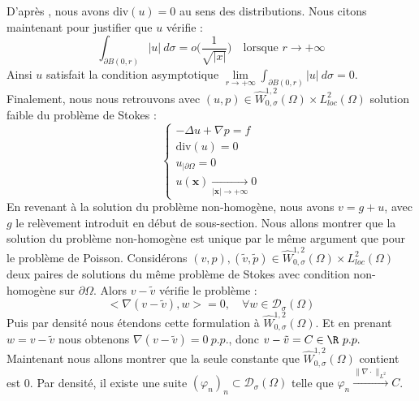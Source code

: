 D'après \cite{Sohr}, nous avons $\text{div}(u) = 0$ au sens des distributions.
Nous citons maintenant \cite{Galdi} pour justifier que $u$ vérifie : 
$$\int_{\partial B(0,r)} |u| \ d\sigma = o\bigg(\frac{1}{\sqrt{|x|}}\bigg) \quad \text{lorsque } r \to +\infty$$ 
Ainsi $u$ satisfait la condition asymptotique $\displaystyle \underset{r \to +\infty}{\lim} \int_{\partial B(0,r)} |u| \ d\sigma = 0$.
Finalement, nous nous retrouvons avec $(u,p) \in \widehat{W}_{0,\sigma}^{1,2}(\Omega)\times L^2_{loc}(\Omega)$ solution faible du problème de Stokes :
$$ \begin{cases}
    -\Delta u + \nabla p = f \\
    \text{div}(u) = 0 \\
    u_{|\partial \Omega} = 0 \\
    u(\mathbf{x}) \xrightarrow[|\mathbf{x}|\to +\infty]{} 0
\end{cases} $$
En revenant à la solution du problème non-homogène, nous avons $v = g + u$, avec $g$ le relèvement introduit en début de sous-section. 
Nous allons montrer que la solution du problème non-homogène est unique par le même argument que pour le problème de Poisson.
Considérons $(v,p),(\tilde{v},\tilde{p}) \in \widehat{W}_{0,\sigma}^{1,2}(\Omega) \times L^2_{loc}(\Omega)$ deux paires de solutions du même problème de Stokes avec condition non-homogène sur $\partial \Omega$. Alors $v - \tilde{v}$ vérifie le problème :
$$ \big< \nabla (v - \tilde{v}), w \big> = 0, \quad \forall w \in \mathcal{D}_{\sigma}(\Omega) $$
Puis par densité nous étendons cette formulation à $\widehat{W}_{0,\sigma}^{1,2}(\Omega)$. Et en prenant $w = v - \tilde{v}$ nous obtenons $\nabla(v - \tilde{v}) = 0 \ p.p.$, donc $v - \tilde{v} = C \in \R \ p.p.$ \\
Maintenant nous allons montrer que la seule constante que $\widehat{W}_{0,\sigma}^{1,2}(\Omega)$ contient est 0.
Par densité, il existe une suite $(\varphi_n)_n \subset \mathcal{D}_{\sigma}(\Omega)$ telle que $\varphi_n \xrightarrow[]{\|\nabla \cdot \|_{L^2}} C$. \\ 
